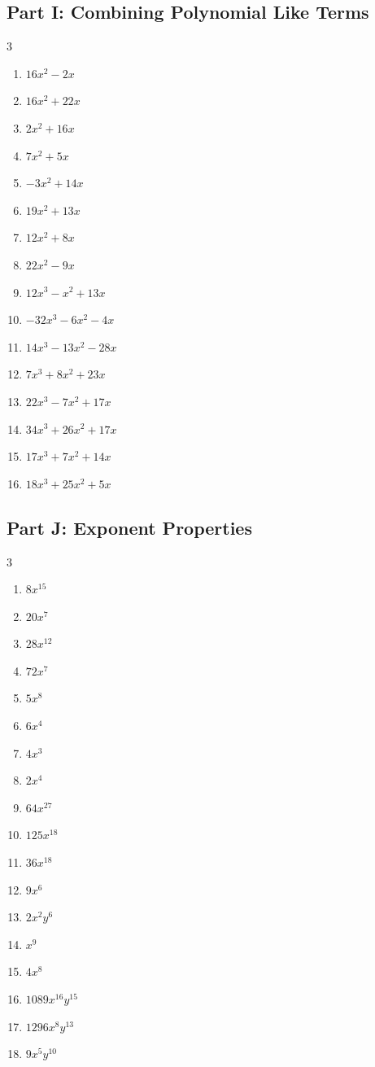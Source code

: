 \documentclass[11pt]{article}
\begin{document}
\subsection*{Part I: Combining Polynomial Like Terms}
\begin{multicols}{3}
\begin{enumerate}
  \item $16 x^{2} - 2 x$
  \item $16 x^{2} + 22 x$
  \item $2 x^{2} + 16 x$
  \item $7 x^{2} + 5 x$
  \item $- 3 x^{2} + 14 x$
  \item $19 x^{2} + 13 x$
  \item $12 x^{2} + 8 x$
  \item $22 x^{2} - 9 x$
  \item $12 x^{3} - x^{2} + 13 x$
  \item $- 32 x^{3} - 6 x^{2} - 4 x$
  \item $14 x^{3} - 13 x^{2} - 28 x$
  \item $7 x^{3} + 8 x^{2} + 23 x$
  \item $22 x^{3} - 7 x^{2} + 17 x$
  \item $34 x^{3} + 26 x^{2} + 17 x$
  \item $17 x^{3} + 7 x^{2} + 14 x$
  \item $18 x^{3} + 25 x^{2} + 5 x$
\end{enumerate}
\end{multicols}
\subsection*{Part J: Exponent Properties}
\begin{multicols}{3}
\begin{enumerate}
  \item $8 x^{15}$
  \item $20 x^{7}$
  \item $28 x^{12}$
  \item $72 x^{7}$
  \item $5 x^{8}$
  \item $6 x^{4}$
  \item $4 x^{3}$
  \item $2 x^{4}$
  \item $64 x^{27}$
  \item $125 x^{18}$
  \item $36 x^{18}$
  \item $9 x^{6}$
  \item $2 x^{2} y^{6}$
  \item $x^{9}$
  \item $4 x^{8}$
  \item $1089 x^{16} y^{15}$
  \item $1296 x^{8} y^{13}$
  \item $9 x^{5} y^{10}$
\end{enumerate}
\end{multicols}
\end{document}
